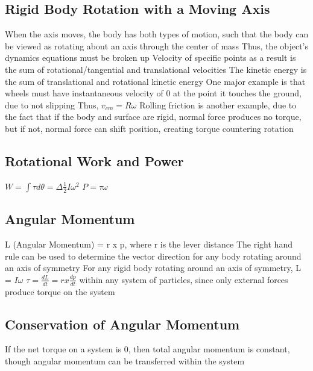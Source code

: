 \documentclass[11 pt, twoside]{article}
\newenvironment{outline*}
{
	\begin{outline}[enumerate]
	}
	{\end{outline}
}
\begin{document}
\subsection{Rigid Body Rotation with a Moving Axis}
\begin{outline*}
\1 When the axis moves, the body has both types of motion, such that the body can be viewed as rotating about an axis through the center of mass
\2 Thus, the object’s dynamics equations must be broken up
\2 Velocity of specific points as a result is the sum of rotational/tangential and translational velocities
\1 The kinetic energy is the sum of translational and rotational kinetic energy
\1 One major example is that wheels must have instantaneous velocity of 0 at the point it touches the ground, due to not slipping
\2 Thus, $v_{cm} = R\omega$
\1 Rolling friction is another example, due to the fact that if the body and surface are rigid, normal force produces no torque, but if not, normal force can shift position, creating torque countering rotation
\end{outline*}
\subsection{Rotational Work and Power}
\begin{outline*}
\1 $W = \int \tau d\theta = \Delta\frac{1}{2}I\omega^2$
\1 $P = \tau\omega$
\end{outline*}
\subsection{Angular Momentum}
\begin{outline*}
\1 L (Angular Momentum) = r x p, where r is the lever distance
\2 The right hand rule can be used to determine the vector direction for any body rotating around an axis of symmetry
\2 For any rigid body rotating around an axis of symmetry, L = $I\omega$
\1 $\tau = \frac{dL}{dt} = r x \frac{dp}{dt}$ within any system of particles, since only external forces produce torque on the system
\end{outline*}
\subsection{Conservation of Angular Momentum}
\begin{outline*}
\1 If the net torque on a system is 0, then total angular momentum is constant, though angular momentum can be transferred within the system
\end{outline*}
\end{document}
